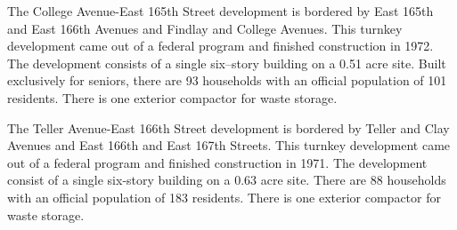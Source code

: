 The College Avenue-East 165th Street development is bordered by East 165th and East 166th Avenues and Findlay and College Avenues. This turnkey development came out of a federal program and finished construction in 1972. The development consists of a single six--story building on a 0.51 acre site. Built exclusively for seniors, there are 93 households with an official population of 101 residents. There is one exterior compactor for waste storage.

The Teller Avenue-East 166th Street development is bordered by Teller and Clay Avenues and East 166th and East 167th Streets. This turnkey development came out of a federal program and finished construction in 1971. The development consist of a single six-story building on a 0.63 acre site. There are 88 households with an official population of 183 residents. There is one exterior compactor for waste storage.